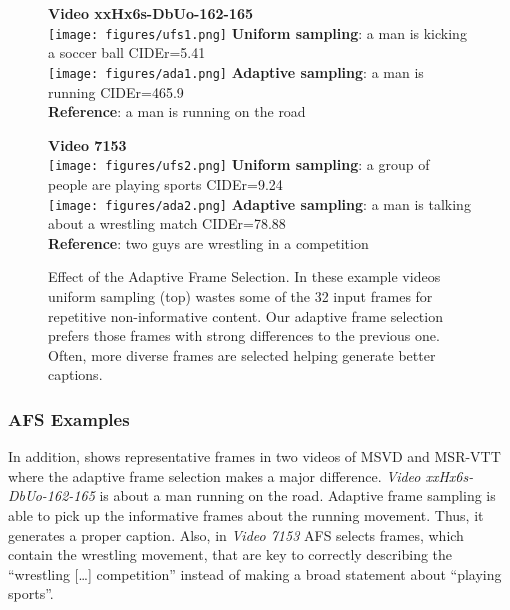 \documentclass[runningheads,table]{llncs}
\begin{document}
\begin{figure*}
    \centering

    {\centering 
     \small{\textbf{Video xxHx6s-DbUo-162-165}} \\
    \texttt{[image: figures/ufs1.png]} 
    }
    \small{ 
        \textbf{Uniform sampling}: a man is kicking a soccer ball CIDEr=5.41} \\[1.5ex]
        
    {\centering 
    \texttt{[image: figures/ada1.png]} 
    }
    \small{ 
        \textbf{Adaptive sampling}: a man is running CIDEr=465.9\\
        \textbf{Reference}: a man is running on the road } \\[2ex]
        
\vspace{1ex}




    {\centering 
    \small{\textbf{Video 7153}}\\
    \texttt{[image: figures/ufs2.png]} 
    }
    \small{ 
        \textbf{Uniform sampling}: a group of people are playing sports CIDEr=9.24} \\[1.5ex]
     {\centering 
    \texttt{[image: figures/ada2.png]}
    }
    \small{ 
        \textbf{Adaptive sampling}: a man is talking about a wrestling match CIDEr=78.88 \\
        \textbf{Reference}: two guys are wrestling in a competition \\
    }
    \caption{Effect of the Adaptive Frame Selection. In these example videos uniform sampling (top) wastes some of the 32 input frames for repetitive non-informative content. Our adaptive frame selection prefers those frames with strong differences to the previous one. Often, more diverse frames are selected helping generate better captions.}\label{fig:AFSSupp}
\end{figure*}

\subsubsection{AFS Examples}
In addition,  shows representative frames in two videos of MSVD and MSR-VTT where the adaptive frame selection makes a major difference.
\textit{Video xxHx6s-DbUo-162-165} is about a man running on the road. Adaptive frame sampling is able to pick up the informative frames about the running movement. Thus, it generates a proper caption.
Also, in \textit{Video 7153} AFS selects frames, which contain the wrestling movement, that are key to correctly describing the \enquote{wrestling [\ldots] competition} instead of making a broad statement about \enquote{playing sports}.
\end{document}
